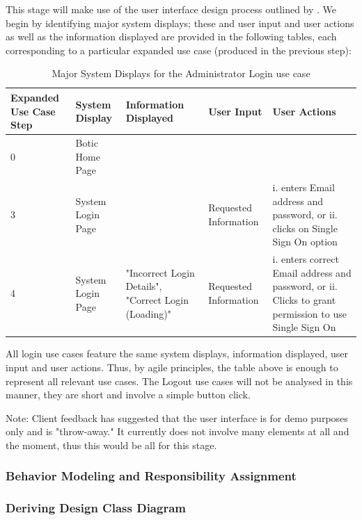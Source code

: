\documentclass[11pt]{article}
\begin{document}
This stage will make use of the user interface design process outlined by \cite{Book:1}. We begin by identifying major system displays; these and user input and user actions as well as the information displayed are provided in the following tables, each corresponding to a particular expanded use case (produced in the previous step):

\begin{table}[H]
	\centering
	\hspace*{-0.17cm}\begin{tabular}{|p{2cm}|p{3cm}|p{3cm}|p{3cm}|p{5cm}|}
		\hline
		Expanded Use Case Step & System Display & Information Displayed & User Input & User Actions \\
		\hline
		0 & Botic Home Page & & & \\
		\hline
		3 & System Login Page & & Requested Information & i. enters Email address and password, or ii. clicks on Single Sign On option \\
		\hline
		4 & System Login Page & "Incorrect Login Details", "Correct Login (Loading)" & Requested Information & i. enters correct Email address and password, or ii. Clicks to grant permission to use Single Sign On \\
		\hline
	\end{tabular}
	\caption{Major System Displays for the Administrator Login use case}
\end{table}
All login use cases feature the same system displays, information displayed, user input and user actions. Thus, by agile principles, the table above is enough to represent all relevant use cases. The Logout use cases will not be analysed in this manner, they are short and involve a simple button click.

Note: Client feedback has suggested that the user interface is for demo purposes only and is "throw-away." It currently does not involve many elements at all and the moment, thus this would be all for this stage.

\subsubsection{Behavior Modeling and Responsibility Assignment}
 
\subsubsection{Deriving Design Class Diagram}
 
\end{document}
